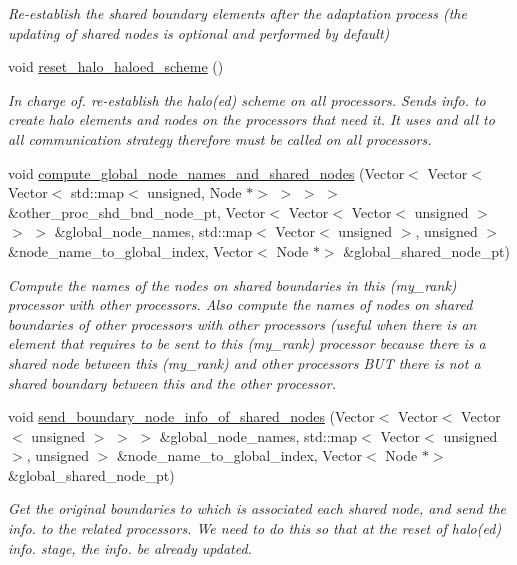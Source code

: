 \begin{DoxyCompactItemize}
\begin{DoxyCompactList}\small\item\em Re-\/establish the shared boundary elements after the adaptation process (the updating of shared nodes is optional and performed by default) \end{DoxyCompactList}\item 
void \hyperlink{classoomph_1_1RefineableTriangleMesh_a9ba5601a6630b8c2c2ee75fe11d2c6be}{reset\+\_\+halo\+\_\+haloed\+\_\+scheme} ()
\begin{DoxyCompactList}\small\item\em In charge of. re-\/establish the halo(ed) scheme on all processors. Sends info. to create halo elements and nodes on the processors that need it. It uses and all to all communication strategy therefore must be called on all processors. \end{DoxyCompactList}\item 
void \hyperlink{classoomph_1_1RefineableTriangleMesh_a6f98720e48868896fd4360ee10ebdd09}{compute\+\_\+global\+\_\+node\+\_\+names\+\_\+and\+\_\+shared\+\_\+nodes} (Vector$<$ Vector$<$ Vector$<$ std\+::map$<$ unsigned, Node $\ast$$>$ $>$ $>$ $>$ \&other\+\_\+proc\+\_\+shd\+\_\+bnd\+\_\+node\+\_\+pt, Vector$<$ Vector$<$ Vector$<$ unsigned $>$ $>$ $>$ \&global\+\_\+node\+\_\+names, std\+::map$<$ Vector$<$ unsigned $>$, unsigned $>$ \&node\+\_\+name\+\_\+to\+\_\+global\+\_\+index, Vector$<$ Node $\ast$$>$ \&global\+\_\+shared\+\_\+node\+\_\+pt)
\begin{DoxyCompactList}\small\item\em Compute the names of the nodes on shared boundaries in this (my\+\_\+rank) processor with other processors. Also compute the names of nodes on shared boundaries of other processors with other processors (useful when there is an element that requires to be sent to this (my\+\_\+rank) processor because there is a shared node between this (my\+\_\+rank) and other processors B\+UT there is not a shared boundary between this and the other processor. \end{DoxyCompactList}\item 
void \hyperlink{classoomph_1_1RefineableTriangleMesh_a995a2a4b90565b3d53e06fdc2ed24be1}{send\+\_\+boundary\+\_\+node\+\_\+info\+\_\+of\+\_\+shared\+\_\+nodes} (Vector$<$ Vector$<$ Vector$<$ unsigned $>$ $>$ $>$ \&global\+\_\+node\+\_\+names, std\+::map$<$ Vector$<$ unsigned $>$, unsigned $>$ \&node\+\_\+name\+\_\+to\+\_\+global\+\_\+index, Vector$<$ Node $\ast$$>$ \&global\+\_\+shared\+\_\+node\+\_\+pt)
\begin{DoxyCompactList}\small\item\em Get the original boundaries to which is associated each shared node, and send the info. to the related processors. We need to do this so that at the reset of halo(ed) info. stage, the info. be already updated. \end{DoxyCompactList}\item 
$$
\end{DoxyCompactItemize}
